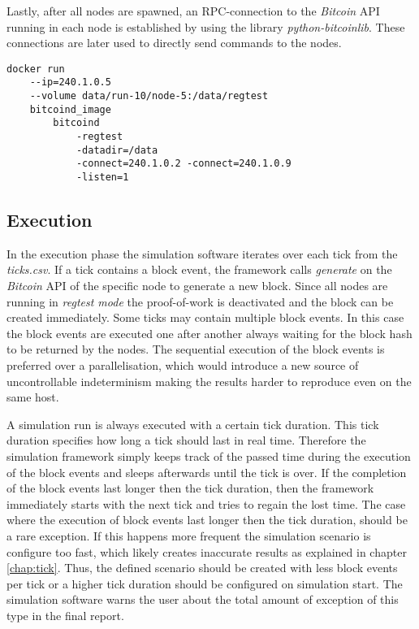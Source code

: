 Lastly, after all nodes are spawned, an RPC-connection to the \textit{Bitcoin} API running in each node is established by using the library \textit{python-bitcoinlib}.
These connections are later used to directly send commands to the nodes.

\begin{minipage}{\linewidth}
\begin{lstlisting}[caption=Simplified version of how a node is started with \textit{Docker} and \textit{bitcoind}, label={lst:docker_create}, basicstyle=\ttfamily, captionpos=b]
docker run
	--ip=240.1.0.5
	--volume data/run-10/node-5:/data/regtest
	bitcoind_image
		bitcoind
			-regtest
			-datadir=/data
			-connect=240.1.0.2 -connect=240.1.0.9
			-listen=1
\end{lstlisting}
\end{minipage}
	
\subsection{Execution}

In the execution phase the simulation software iterates over each tick from the \textit{ticks.csv}.
If a tick contains a block event, the framework calls \textit{generate} on the \textit{Bitcoin} API of the specific node to generate a new block.
Since all nodes are running in \textit{regtest mode} the proof-of-work is deactivated and the block can be created immediately.
Some ticks may contain multiple block events.
In this case the block events are executed one after another always waiting for the block hash to be returned by the nodes.
The sequential execution of the block events is preferred over a parallelisation, which would introduce a new source of uncontrollable indeterminism making the results harder to reproduce even on the same host.

A simulation run is always executed with a certain tick duration.
This tick duration specifies how long a tick should last in real time.
Therefore the simulation framework simply keeps track of the passed time during the execution of the block events and sleeps afterwards until the tick is over.
If the completion of the block events last longer then the tick duration, then the framework immediately starts with the next tick and tries to regain the lost time.
The case where the execution of block events last longer then the tick duration, should be a rare exception.
If this happens more frequent the simulation scenario is configure too fast, which likely creates inaccurate results as explained in chapter \ref{chap:tick}.
Thus, the defined scenario should be created with less block events per tick or a higher tick duration should be configured on simulation start.
The simulation software warns the user about the total amount of exception of this type in the final report.

